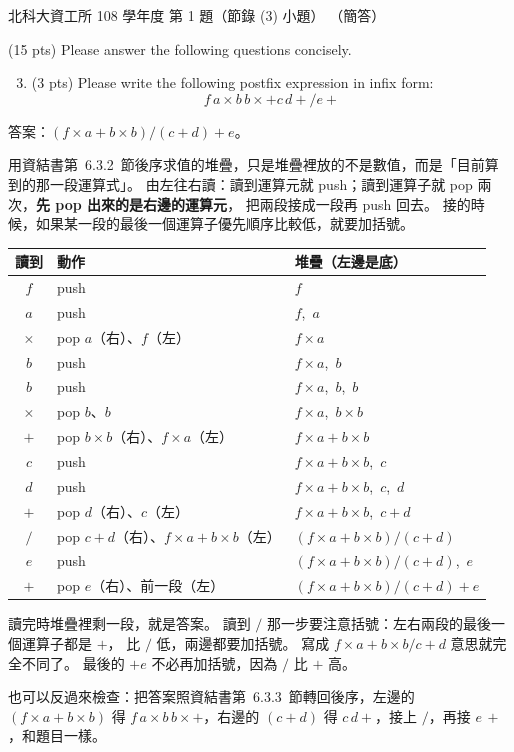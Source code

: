 \begin{pastexam}[label={px:ntut-108-ci-01}]{北科大資工所 108 學年度 第 1 題（節錄 (3) 小題）}
（簡答）

(15 pts) Please answer the following questions concisely.
\begin{enumerate}[label=(\arabic*)]
\setcounter{enumi}{2}
\item (3 pts) Please write the following postfix expression in infix form:
\[ f\,a \times b\,b \times + c\,d + / e + \]
\end{enumerate}
\end{pastexam}

\begin{pastsoln}
答案：$(f \times a + b \times b) / (c + d) + e$。

用資結書第~6.3.2~節後序求值的堆疊，只是堆疊裡放的不是數值，而是「目前算到的那一段運算式」。
由左往右讀：讀到運算元就 push；讀到運算子就 pop 兩次，\textbf{先 pop 出來的是右邊的運算元}，
把兩段接成一段再 push 回去。 接的時候，如果某一段的最後一個運算子優先順序比較低，就要加括號。

\begin{center}
\small
\begin{tabular}{cll}
\toprule
讀到 & 動作 & 堆疊（左邊是底） \\
\midrule
$f$ & push & $f$ \\
$a$ & push & $f$,\ $a$ \\
$\times$ & pop $a$（右）、$f$（左） & $f \times a$ \\
$b$ & push & $f \times a$,\ $b$ \\
$b$ & push & $f \times a$,\ $b$,\ $b$ \\
$\times$ & pop $b$、$b$ & $f \times a$,\ $b \times b$ \\
$+$ & pop $b \times b$（右）、$f \times a$（左） & $f \times a + b \times b$ \\
$c$ & push & $f \times a + b \times b$,\ $c$ \\
$d$ & push & $f \times a + b \times b$,\ $c$,\ $d$ \\
$+$ & pop $d$（右）、$c$（左） & $f \times a + b \times b$,\ $c + d$ \\
$/$ & pop $c + d$（右）、$f \times a + b \times b$（左） & $(f \times a + b \times b) / (c + d)$ \\
$e$ & push & $(f \times a + b \times b) / (c + d)$,\ $e$ \\
$+$ & pop $e$（右）、前一段（左） & $(f \times a + b \times b) / (c + d) + e$ \\
\bottomrule
\end{tabular}
\end{center}

讀完時堆疊裡剩一段，就是答案。 讀到 $/$ 那一步要注意括號：左右兩段的最後一個運算子都是 $+$，
比 $/$ 低，兩邊都要加括號。 寫成 $f \times a + b \times b / c + d$ 意思就完全不同了。 最後的
$+ e$ 不必再加括號，因為 $/$ 比 $+$ 高。

也可以反過來檢查：把答案照資結書第~6.3.3~節轉回後序，左邊的 $(f \times a + b \times b)$ 得
$f\,a \times b\,b \times +$，右邊的 $(c + d)$ 得 $c\,d +$，接上 $/$，再接 $e\,+$，和題目一樣。
\end{pastsoln}
